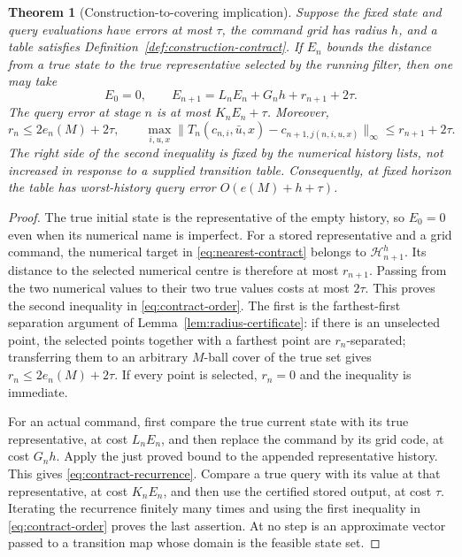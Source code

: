 \documentclass[11pt]{amsart}
\newtheorem{theorem}{Theorem}[section]
\theoremstyle{definition}\newtheorem{definition}[theorem]{Definition}
\theoremstyle{remark}\newtheorem{remark}[theorem]{Remark}
\begin{document}
\begin{theorem}[Construction-to-covering implication]
\label{thm:construction-contract}
Suppose the fixed state and query evaluations have errors at most $\tau$,
the command grid has radius $h$, and a table satisfies
Definition~\ref{def:construction-contract}. If $E_n$ bounds the distance
from a true state to the true representative selected by the running
filter, then one may take
\begin{equation}\label{eq:contract-recurrence}
 E_0=0,\qquad E_{n+1}=L_nE_n+G_nh+r_{n+1}+2\tau.
\end{equation}
The query error at stage $n$ is at most $K_nE_n+\tau$.
Moreover,
\begin{equation}\label{eq:contract-order}
 r_n\le 2e_n(M)+2\tau,\qquad
 \max_{i,u,x}\|T_n(c_{n,i},\bar u,x)-c_{n+1,j(n,i,u,x)}\|_\infty
       \le r_{n+1}+2\tau.
\end{equation}
The right side of the second inequality is fixed by the numerical
history lists, not increased in response to a supplied transition table.
Consequently, at fixed horizon the table has worst-history query error
$O(e(M)+h+\tau)$.
\end{theorem}
\begin{proof}
The true initial state is the representative of the empty history, so
$E_0=0$ even when its numerical name is imperfect. For a stored
representative and a grid command, the numerical target in
\eqref{eq:nearest-contract} belongs to $\mathcal H_{n+1}^h$.
Its distance to the selected numerical centre is therefore at most
$r_{n+1}$. Passing from the two numerical values to their two true
values costs at most $2\tau$. This proves the second inequality in
\eqref{eq:contract-order}. The first is the farthest-first separation
argument of Lemma~\ref{lem:radius-certificate}: if there is an
unselected point, the selected points together with a farthest point
are $r_n$-separated; transferring them to an arbitrary $M$-ball cover
of the true set gives $r_n\le2e_n(M)+2\tau$. If every point is
selected, $r_n=0$ and the inequality is immediate.

For an actual command, first compare the true current state with its
true representative, at cost $L_nE_n$, and then replace the command
by its grid code, at cost $G_nh$. Apply the just proved bound to the
appended representative history. This gives
\eqref{eq:contract-recurrence}. Compare a true query with its value
at that representative, at cost $K_nE_n$, and then use the certified
stored output, at cost $\tau$. Iterating the recurrence finitely many
times and using the first inequality in \eqref{eq:contract-order}
proves the last assertion. At no step is an approximate vector passed
to a transition map whose domain is the feasible state set.
\end{proof}
\end{document}

